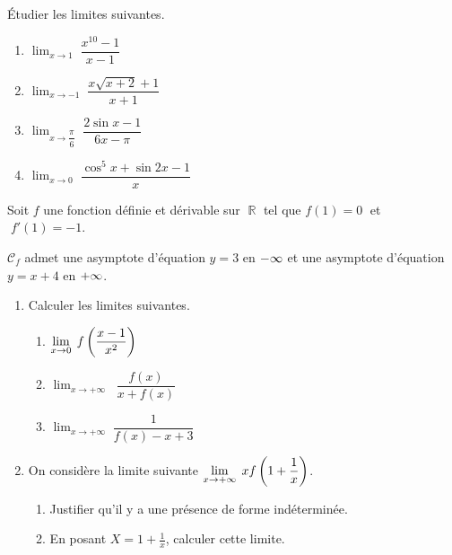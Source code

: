   \begin{exercice}
Étudier les limites suivantes.
\begin{enumerate}
\item $\displaystyle \lim_{x \to 1}\;\dfrac{x^{10}-1}{x-1} $
\item $\displaystyle  \lim_{x \to -1} \; \dfrac{x\sqrt{x+2}+1}{x+1}$
\item $ \displaystyle \lim_{x \to  \dfrac{\pi}{6}} \; \dfrac{2\sin x-1}{6x-\pi}$
\item  $ \displaystyle  \lim_{x \to 0} \; \dfrac{\cos^5 x+\sin 2x-1}{x} $ 
\end{enumerate}
\end{exercice}
 \begin{exercice}

 Soit $ f $ une  fonction  définie et dérivable sur  $\;\mathbb{R} \;$   tel que $ f(1)=0 \;$   et   $\; f'(1)=-1 $.
 
 \medskip
 
  $ \mathcal{C}_{f} $ admet  une asymptote d'équation $ y=3 $  en $ -\infty $  et une asymptote d'équation $ y=x+4 $  en $ +\infty $.

\medskip
\begin{enumerate}
\item Calculer les limites suivantes.

\begin{enumerate}
\item $ \displaystyle\lim_{x \to 0}\; f\left(\dfrac{x-1}{x^2}\right)$
\item $ \displaystyle\lim_{x \to +\infty}\;\;\dfrac{f(x)}{ x+f(x)}$
\item $\displaystyle \lim_{x \to +\infty}\; \dfrac{1}{f(x)-x+3}$
\end{enumerate}

\medskip
\item On considère  la limite  suivante  $\displaystyle \lim_{x \to +\infty}\; xf\left(1+\dfrac{1}{x}\right)$.

\medskip 
\begin{enumerate}
\item Justifier qu'il y a une présence de forme indéterminée.
\item En posant $ X=1+\frac{1}{x} $,   calculer cette limite.
\end{enumerate}


\end{enumerate}

 
\end{exercice}

